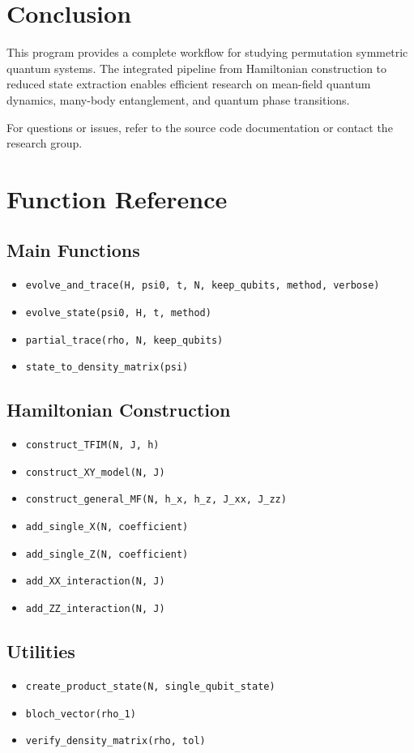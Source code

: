 \documentclass[11pt,a4paper]{article}
\begin{document}
\section{Conclusion}

This program provides a complete workflow for studying permutation symmetric quantum systems. The integrated pipeline from Hamiltonian construction to reduced state extraction enables efficient research on mean-field quantum dynamics, many-body entanglement, and quantum phase transitions.

For questions or issues, refer to the source code documentation or contact the research group.

\appendix

\section{Function Reference}

\subsection{Main Functions}

\begin{itemize}
    \item \texttt{evolve\_and\_trace(H, psi0, t, N, keep\_qubits, method, verbose)}
    \item \texttt{evolve\_state(psi0, H, t, method)}
    \item \texttt{partial\_trace(rho, N, keep\_qubits)}
    \item \texttt{state\_to\_density\_matrix(psi)}
\end{itemize}

\subsection{Hamiltonian Construction}

\begin{itemize}
    \item \texttt{construct\_TFIM(N, J, h)}
    \item \texttt{construct\_XY\_model(N, J)}
    \item \texttt{construct\_general\_MF(N, h\_x, h\_z, J\_xx, J\_zz)}
    \item \texttt{add\_single\_X(N, coefficient)}
    \item \texttt{add\_single\_Z(N, coefficient)}
    \item \texttt{add\_XX\_interaction(N, J)}
    \item \texttt{add\_ZZ\_interaction(N, J)}
\end{itemize}

\subsection{Utilities}

\begin{itemize}
    \item \texttt{create\_product\_state(N, single\_qubit\_state)}
    \item \texttt{bloch\_vector(rho\_1)}
    \item \texttt{verify\_density\_matrix(rho, tol)}
\end{itemize}
\end{document}
